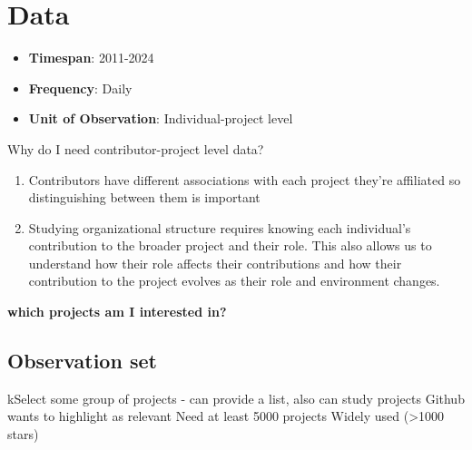 \documentclass[12pt,notitlepage]{article}
\begin{document}
\section*{Data}


\begin{itemize}
    \item \textbf{Timespan}: 2011-2024
    \item \textbf{Frequency}: Daily
    \item \textbf{Unit of Observation}: Individual-project level
\end{itemize}

Why do I need contributor-project level data? 
\begin{enumerate}
    \item Contributors have different associations with each project they're affiliated so distinguishing between them is important
    \item Studying organizational structure requires knowing each individual's contribution to the broader project and their role. This also allows us to understand how their role affects their contributions and how their contribution to the project evolves as their role and environment changes.  
\end{enumerate}

\textbf{which projects am I interested in?}
\subsection*{Observation set}
kSelect some group of projects - can provide a list, also can study projects Github wants to highlight as relevant
Need at least 5000 projects
Widely used (>1000 stars)
\end{document}
